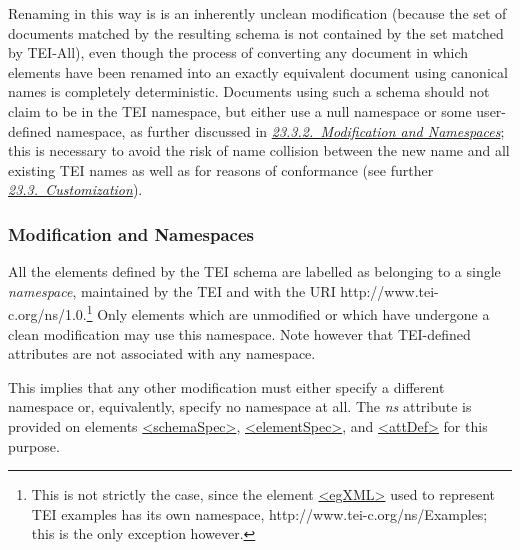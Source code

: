 Renaming in this way is  is an inherently unclean modification (because the set of documents matched by the resulting schema is not contained by the set matched by TEI-All), even though the process of converting any document in which elements have been renamed into an exactly equivalent document using canonical names is completely deterministic. Documents using such a schema should not claim to be in the TEI namespace, but either use a null namespace or some user-defined namespace, as further discussed in \textit{\hyperref[MDNS]{23.3.2.\ Modification and Namespaces}}; this is necessary to avoid the risk of name collision between the new name and all existing TEI names as well as for reasons of conformance (see further \textit{\hyperref[MD]{23.3.\ Customization}}).
\subsubsection[{Modification and Namespaces}]{Modification and Namespaces}\label{MDNS}\par
All the elements defined by the TEI schema are labelled as belonging to a single \textit{namespace}, maintained by the TEI and with the URI http://www.tei-c.org/ns/1.0.\footnote{This is not strictly the case, since the element \hyperref[TEI.egXML]{<egXML>} used to represent TEI examples has its own namespace, http://www.tei-c.org/ns/Examples; this is the only exception however.} Only elements which are unmodified or which have undergone a clean modification may use this namespace. Note however that TEI-defined attributes are not associated with any namespace. \par
This implies that any other modification  must either specify a different namespace or, equivalently, specify no namespace at all. The {\itshape ns} attribute is provided on elements \hyperref[TEI.schemaSpec]{<schemaSpec>}, \hyperref[TEI.elementSpec]{<elementSpec>}, and \hyperref[TEI.attDef]{<attDef>} for this purpose.\par
